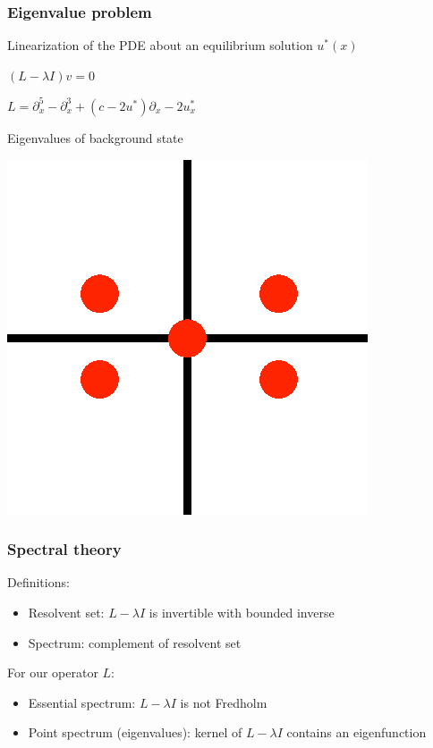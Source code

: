 \documentclass[16pt]{beamer}
\begin{document}
\begin{frame}
	\frametitle{Eigenvalue problem}
	\fontsize{16}{7.2}\selectfont
	Linearization of the PDE about an equilibrium solution $u^*(x)$

	\begin{center}
		$(L - \lambda I )v = 0$
	\end{center}

	\begin{center}
		$L = \partial_x^5 - \partial_x^3 + (c - 2 u^*)\partial_x - 2 u^*_x $
	\end{center}
	Eigenvalues of background state
	\begin{center}
		\includegraphics[width=0.2\linewidth]{images/eignonhyp.eps}
	\end{center}
\end{frame}

\begin{frame}
	\frametitle{Spectral theory}
	\fontsize{16}{7.2}\selectfont
	Definitions:
	\begin{itemize}
		\item Resolvent set: $L - \lambda I$ is invertible with bounded inverse
		\vspace{0.5cm}
		\item Spectrum: complement of resolvent set
	\end{itemize}
	\vspace{1cm}
	For our operator $L$:
	\begin{itemize}
		\item Essential spectrum: $L - \lambda I$ is not Fredholm
		\vspace{0.5cm}
		\item Point spectrum (eigenvalues): kernel of $L - \lambda I$ contains an eigenfunction 
	\end{itemize}
\end{frame}
\end{document}
